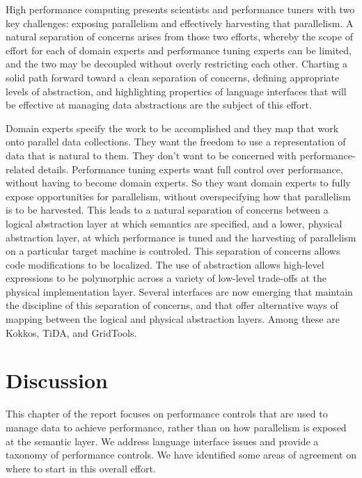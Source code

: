 High performance computing presents scientists and performance tuners
with two key challenges: exposing parallelism and effectively
harvesting that parallelism.  A natural separation of concerns arises
from those two efforts, whereby the scope of effort for each of domain
experts and performance tuning experts can be limited, and the two may
be decoupled without overly restricting each other.  Charting a solid
path forward toward a clean separation of concerns, defining
appropriate levels of abstraction, and highlighting properties of
language interfaces that will be effective at managing data
abstractions are the subject of this effort.

Domain experts specify the work to be accomplished and they map that
work onto parallel data collections.  They want the freedom to use a
representation of data that is natural to them.  They don't want to be
concerned with performance-related details.  Performance tuning
experts want full control over performance, without having to become
domain experts.  So they want domain experts to fully expose
opportunities for parallelism, without overspecifying how that
parallelism is to be harvested.  This leads to a natural separation of
concerns between a logical abstraction layer at which semantics are
specified, and a lower, physical abstraction layer, at which
performance is tuned and the harvesting of parallelism on a particular
target machine is controled.  This separation of concerns allows code
modifications to be localized.  The use of abstraction allows
high-level expressions to be polymorphic across a variety of low-level
trade-offs at the physical implementation layer.  Several interfaces
are now emerging that maintain the discipline of this separation of
concerns, and that offer alternative ways of mapping between the
logical and physical abstraction layers.  Among these are Kokkos, TiDA,
and GridTools.

\section{Discussion}

This chapter of the report focuses on performance controls that are
used to manage data to achieve performance, rather than on how
parallelism is exposed at the semantic layer.  We address language
interface issues and provide a taxonomy of performance controls.
 We have identified some
areas of agreement on where to start in this overall effort.

